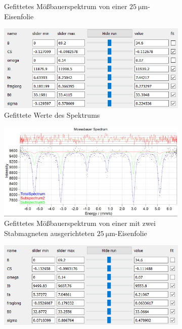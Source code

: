\documentclass[german, %
parskip=full, %
bibliography=totoc, %
]{scrartcl}
\begin{document}
\begin{figure}[ht]
\begin{subfigure}[b]{0.5\textwidth}
	  \caption{Gefittetes Mößbauerspektrum von einer \(\SI{25}{\micro\meter}\)-Eisenfolie}
	  \label{fig:moess25}
  \end{subfigure}
  \begin{subfigure}[b]{0.4\textwidth}
	  \includegraphics[width=\textwidth]{WerteEisen25}
	  \caption{Gefittete Werte des Spektrums}
	  \label{fig:werte25}
  \end{subfigure}
	\begin{subfigure}[b]{0.5\textwidth}
		\includegraphics[width=\textwidth]{MoessbauerEisen25MagnetGerade}
	  \caption{Gefittetes Mößbauerspektrum von einer mit zwei Stabmagneten ausgerichteten \(\SI{25}{\micro\meter}\)-Eisenfolie}
	  \label{fig:moess25gerade}
  \end{subfigure}
  \begin{subfigure}[b]{0.4\textwidth}
	  \includegraphics[width=\textwidth]{WerteEisen25MagnetGerade}

\end{subfigure}
\end{figure}
\end{document}

